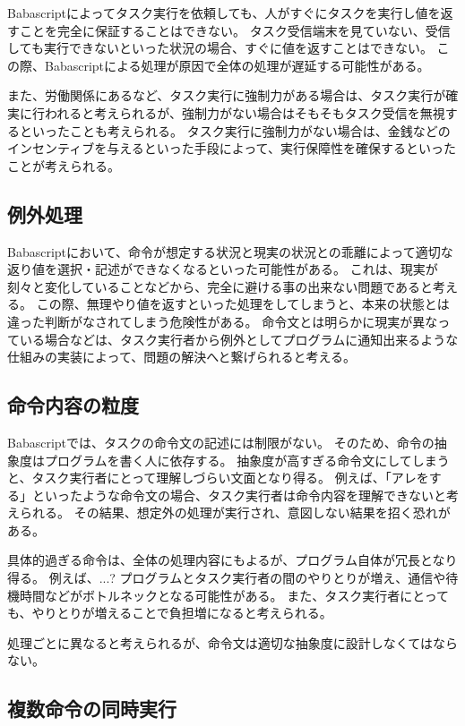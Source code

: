 \documentclass[twoside]{wiss}
\begin{document}
Babascriptによってタスク実行を依頼しても、人がすぐにタスクを実行し値を返すことを完全に保証することはできない。
タスク受信端末を見ていない、受信しても実行できないといった状況の場合、すぐに値を返すことはできない。
この際、Babascriptによる処理が原因で全体の処理が遅延する可能性がある。

また、労働関係にあるなど、タスク実行に強制力がある場合は、タスク実行が確実に行われると考えられるが、強制力がない場合はそもそもタスク受信を無視するといったことも考えられる。
タスク実行に強制力がない場合は、金銭などのインセンティブを与えるといった手段によって、実行保障性を確保するといったことが考えられる。

\subsection{例外処理}

Babascriptにおいて、命令が想定する状況と現実の状況との乖離によって適切な返り値を選択・記述ができなくなるといった可能性がある。
これは、現実が刻々と変化していることなどから、完全に避ける事の出来ない問題であると考える。
この際、無理やり値を返すといった処理をしてしまうと、本来の状態とは違った判断がなされてしまう危険性がある。
命令文とは明らかに現実が異なっている場合などは、タスク実行者から例外としてプログラムに通知出来るような仕組みの実装によって、問題の解決へと繋げられると考える。

\subsection{命令内容の粒度}

Babascriptでは、タスクの命令文の記述には制限がない。
そのため、命令の抽象度はプログラムを書く人に依存する。
抽象度が高すぎる命令文にしてしまうと、タスク実行者にとって理解しづらい文面となり得る。
例えば、「アレをする」といったような命令文の場合、タスク実行者は命令内容を理解できないと考えられる。
その結果、想定外の処理が実行され、意図しない結果を招く恐れがある。

具体的過ぎる命令は、全体の処理内容にもよるが、プログラム自体が冗長となり得る。
例えば、...? %
プログラムとタスク実行者の間のやりとりが増え、通信や待機時間などがボトルネックとなる可能性がある。
また、タスク実行者にとっても、やりとりが増えることで負担増になると考えられる。

処理ごとに異なると考えられるが、命令文は適切な抽象度に設計しなくてはならない。

\subsection{複数命令の同時実行}
\end{document}

